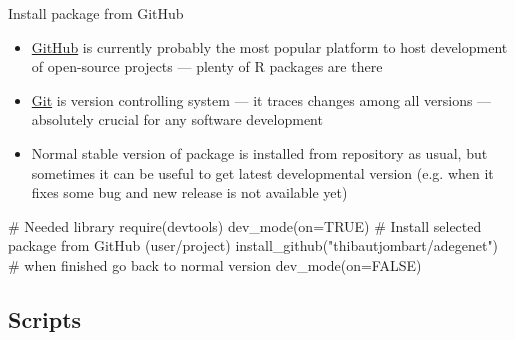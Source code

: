 \documentclass[compress, xelatex, 11pt, xcolor=svgnames, aspectratio=169, url={hyphens, lowtilde}]{beamer}
\begin{document}
\begin{frame}[fragile]{Install package from GitHub}
	\begin{itemize}
		\item \href{https://github.com/}{GitHub} is currently probably the most popular platform to host development of open-source projects --- plenty of R packages are there
		\item \href{https://git-scm.com/book/en/v2}{Git} is version controlling system --- it traces changes among all versions --- absolutely crucial for any software development
		\item Normal stable version of package is installed from repository as usual, but sometimes it can be useful to get latest developmental version (e.g. when it fixes some bug and new release is not available yet)
	\end{itemize}
	\begin{spluscode}
    # Needed library
    require(devtools)
    dev_mode(on=TRUE)
    # Install selected package from GitHub (user/project)
    install_github("thibautjombart/adegenet")
    # when finished go back to normal version
    dev_mode(on=FALSE)
	\end{spluscode}
\end{frame}

\subsection{Scripts}
\end{document}
